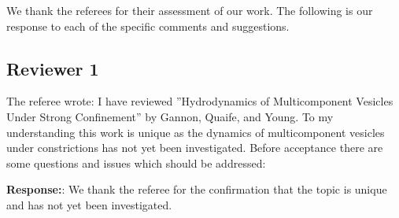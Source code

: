 \documentclass[11pt]{article}
\begin{document}
We thank the referees for their assessment of our work.  The following
is our response to each of the specific comments and suggestions.

\subsection*{Reviewer 1}

The referee wrote: I have reviewed ''Hydrodynamics of Multicomponent
Vesicles Under Strong Confinement'' by Gannon, Quaife, and Young. To my
understanding this work is unique as the dynamics of multicomponent
vesicles under constrictions has not yet been investigated. Before
acceptance there are some questions and issues which should be
addressed:
 
\noindent
{\bf Response:}: We thank the referee for the confirmation that the
topic is unique and has not yet been investigated.
\end{document}
